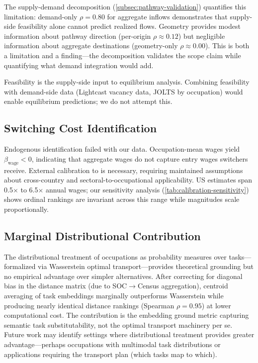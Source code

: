 \documentclass[12pt]{article}
\begin{document}
The supply-demand decomposition (\cref{subsec:pathway-validation}) quantifies this limitation: demand-only $\rho = 0.80$ for aggregate inflows demonstrates that supply-side feasibility alone cannot predict realized flows. Geometry provides modest information about pathway direction (per-origin $\rho \approx 0.12$) but negligible information about aggregate destinations (geometry-only $\rho \approx 0.00$). This is both a limitation and a finding---the decomposition validates the scope claim while quantifying what demand integration would add.

Feasibility is the supply-side input to equilibrium analysis. Combining feasibility with demand-side data (Lightcast vacancy data, JOLTS by occupation) would enable equilibrium predictions; we do not attempt this.


\subsection{Switching Cost Identification}
\label{subsec:limitation-costs}


Endogenous identification failed with our data. Occupation-mean wages yield $\beta_{\mathrm{wage}} < 0$, indicating that aggregate wages do not capture entry wages switchers receive. External calibration to \citet{DixCarneiro2014} is necessary, requiring maintained assumptions about cross-country and sectoral-to-occupational applicability. US estimates span 0.5$\times$ to 6.5$\times$ annual wages; our sensitivity analysis (\cref{tab:calibration-sensitivity}) shows ordinal rankings are invariant across this range while magnitudes scale proportionally.


\subsection{Marginal Distributional Contribution}
\label{subsec:limitation-distributional}


The distributional treatment of occupations as probability measures over tasks---formalized via Wasserstein optimal transport---provides theoretical grounding but no empirical advantage over simpler alternatives. After correcting for diagonal bias in the distance matrix (due to SOC$\to$Census aggregation), centroid averaging of task embeddings marginally outperforms Wasserstein while producing nearly identical distance rankings (Spearman $\rho = 0.95$) at lower computational cost. The contribution is the embedding ground metric capturing semantic task substitutability, not the optimal transport machinery per se. Future work may identify settings where distributional treatment provides greater advantage---perhaps occupations with multimodal task distributions or applications requiring the transport plan (which tasks map to which).
\end{document}

